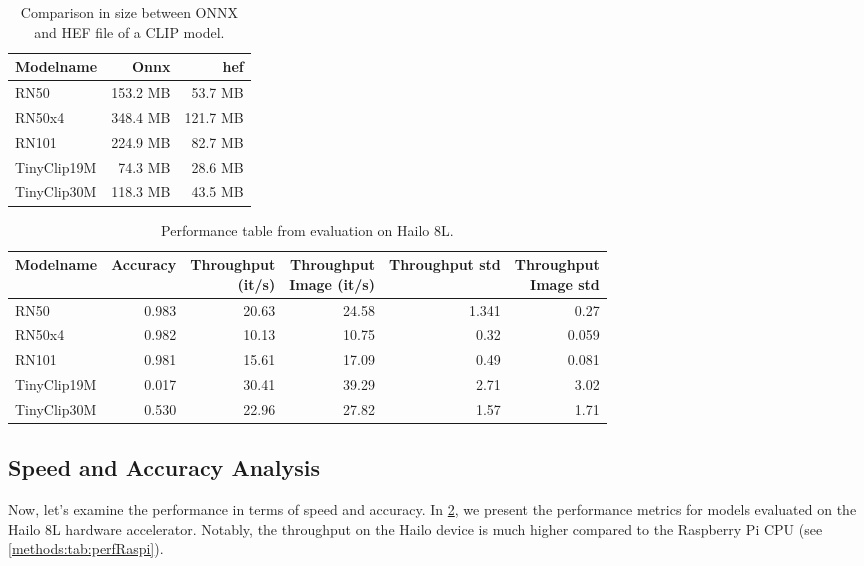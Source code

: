 \begin{table}
    \centering
    \begin{tabular}{l|rr}
    \hline
    Modelname & Onnx & \acrshort{hef}\\\hline
    RN50 & 153.2 MB & 53.7 MB \\ 
    RN50x4 & 348.4 MB & 121.7 MB  \\ 
    RN101 & 224.9 MB  & 82.7 MB \\
    TinyClip19M & 74.3 MB & 28.6 MB  \\ 
    TinyClip30M & 118.3 MB & 43.5 MB  \\ 
    \end{tabular}
    \caption{Comparison in size between ONNX and HEF file of a CLIP model.}
    \label{methods:tab:sizecompare}
\end{table}

\begin{table}[!h]
    \centering
    \begin{tabular}{l|rrrrr}
    \hline
    Modelname & Accuracy & \makecell{Throughput\\(it/s)} & \makecell{Throughput \\ Image (it/s)} & Throughput std & \makecell{Throughput\\Image std} \\ \hline
    RN50    & 0.983 & 20.63 & 24.58 & 1.341 & 0.27 \\ 
    RN50x4  & 0.982 & 10.13 & 10.75 & 0.32 & 0.059 \\ 
    RN101   & 0.981 & 15.61 & 17.09 & 0.49 & 0.081 \\ 
    TinyClip19M & 0.017 & 30.41 & 39.29 & 2.71 & 3.02 \\ 
    TinyClip30M & 0.530 & 22.96 & 27.82 & 1.57 & 1.71 \\ 
    \end{tabular}
    \caption{Performance table from evaluation on Hailo 8L.}
    \label{methods:tab:perfHailo}
\end{table}

\subsection{Speed and Accuracy Analysis}

Now, let's examine the performance in terms of speed and accuracy.
In \cref{methods:tab:perfHailo}, we present the performance metrics for models evaluated on the Hailo 8L hardware accelerator.
Notably, the throughput on the Hailo device is much higher compared to the Raspberry Pi CPU (see \cref{methods:tab:perfRaspi}).

